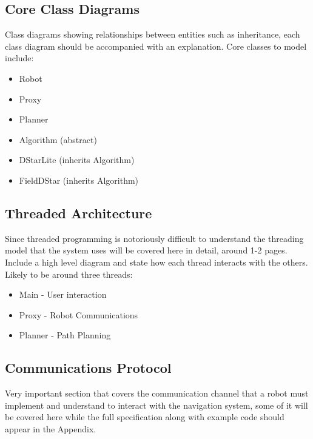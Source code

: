 \subsection{Core Class Diagrams}

\noindent
Class diagrams showing relationships between entities such as inheritance, each class diagram should be accompanied with an explanation. Core classes to model include:

\begin{itemize}
\item Robot
\item Proxy
\item Planner
\item Algorithm (abstract)
\item DStarLite (inherits Algorithm)
\item FieldDStar (inherits Algorithm)
\end{itemize} 

\newpage

\subsection{Threaded Architecture}

\noindent
Since threaded programming is notoriously difficult to understand the threading model that the system uses will be covered here in detail, around 1-2 pages. Include a high level diagram and state how each thread interacts with the others. Likely to be around three threads:

\begin{itemize}
\item Main - User interaction
\item Proxy - Robot Communications
\item Planner - Path Planning
\end{itemize} 

\subsection{Communications Protocol}
Very important section that covers the communication channel that a robot must implement and understand to interact with the navigation system, some of it will be covered here while the full specification along with example code should appear in the Appendix.


